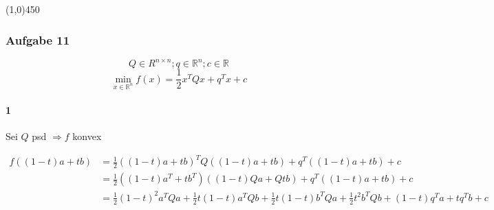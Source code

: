 \documentclass{article}
\newcommand{\hr}{\begin{center} \line(1,0){450} \end{center}}
\begin{document}



\hr
\subsubsection*{Aufgabe 11}
$$Q  \in R^{n\times n};q \in \mathbb{R}^n; c \in \mathbb{R}$$
$$\min\limits_{x \in \mathbb{R}^n} f(x) = \frac{1}{2} x^TQx+q^Tx+c$$

\paragraph{1} Sei $Q$ psd $\Rightarrow f$ konvex


\begin{equation}
\begin{split}
f((1-t)a+tb) &= \frac{1}{2}((1-t)a+tb)^T Q ((1-t)a+tb)+ q^T((1-t)a+tb) + c \\
&= \frac{1}{2}((1-t)a^T + tb^T) ((1-t)Qa + Qtb) + q^T((1-t)a+tb) + c\\
&= \frac{1}{2}(1-t)^2 a^TQa + \frac{1}{2}t(1-t)a^TQb + \frac{1}{2}t(1-t)b^TQa + \frac{1}{2}t^2b^TQb + (1-t)q^Ta+t q^Tb +c%
\end{split}
\end{equation}
\end{document}
